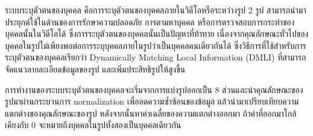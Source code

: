 ระบบระบุตัวตนของบุคคล คือการระบุตัวตนของบุคคลภายในวิดีโอหรือระหว่างรูป 2 รูป สามารถนำมาประยุกต์ใช้ในด้านของการรักษาความปลอดภัย 
การตามหาบุคคล หรือการตรวจสอบการกระทำของบุคคลนั้นในวิดีโอได้ ซึ่งการระบุตัวตนของบุคคลนั้นเป็นปัญหาที่ท้าทาย 
เนื่องจากคุณลักษณะทั่วไปของบุคคลในรูปไม่เพียงพอต่อการระบุบุคคลภายในรูปว่าเป็นบุคคลคนเดียวกันได้ 
ซึ่งวิธีการที่ใช้สำหรับการระบุตัวตนของบุคคลเรียกว่า Dynamically Matching Local Information (DMLI) ที่สามารถจัดแนวลายละเอียดข้อมูลของรูป และเพิ่มประสิทธิรูปให้สูงขึ้น

การทำงานของระบบระบุตัวตนของบุคคลจะเริ่มจากการแบ่งรูปออกเป็น 8 ส่วนและนำคุณลักษณะของรูปมาผ่านกระบวนการ normalization เพื่อลดความซ้ำซ้อนของข้อมูล 
แล้วนำมาเปรียบเทียบความแตกต่างของคุณลักษณะของรูป หลังจากนั้นหาค่าเฉลี่ยของความแตกต่างออกมา ถ้าค่าที่ออกมาใกล้เคียงกับ 0 จะหมายถึงบุคคลในรูปทั้งสองเป็นบุคคลเดียวกัน